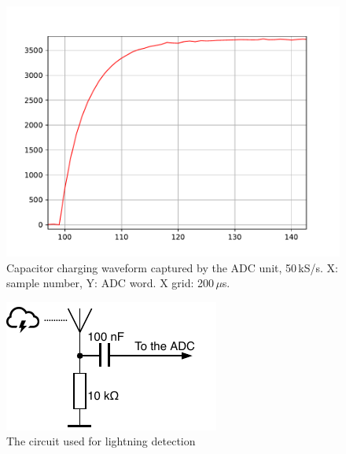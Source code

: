 \begin{figure}[h]
\centering
\includegraphics[width=\textwidth]{img/transient.pdf}
\caption[Capacitor charging waveform captured by the ADC unit]{Capacitor charging waveform captured by the ADC unit, 50\,kS/s. X: sample number, Y: ADC word. X grid: 200\,$\mu$s.}
\label{fig:captransient}
\end{figure}

\begin{figure}[b]
\centering
\includegraphics[scale=1.2]{img/thundertrap.pdf}
\caption{The circuit used for lightning detection}
\label{fig:lightningtrap}
\end{figure}

